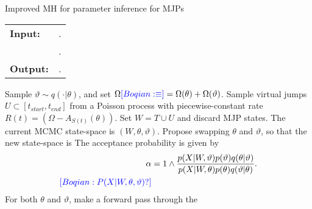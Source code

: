 \begin{algorithm}[H]
   \caption{Improved MH for parameter inference for MJPs }
   \label{alg:MH_improved}
  \begin{tabular}{l l}
   \textbf{Input:  } & \text{The observations $X$,}
                      \text{the previous MJP path $S(t) = (S, T)$ and parameters $\theta$ \boqian{and $\pi_0$}}.\\ 
                     & \text{A  Metropolis-Hasting proposal $q(\cdot | \theta)$}.\\
   \textbf{Output:  }& \text{A new MJP trajectory $S'(t) = (S', T')$, 
                            new MJP parameters $\theta'$}.\\
   \hline
   \end{tabular}
   \begin{algorithmic}[1]
      \State Sample $\vartheta \sim q(\cdot| \theta)$, and 
      set %
	$\Omega \textcolor{blue}{[Boqian: \equiv]} = \Omega(\theta) + \Omega(\vartheta)$.
    \State Sample virtual jumps $U\subset[t_{start}, t_{end}]$ from a Poisson process with 
    piecewise-constant rate $R(t) = (\Omega - A_{S(t)}(\theta))$. 
    Set $W = T \cup U$ and discard MJP states.
    \State The current MCMC state-space is $(W,\theta,\vartheta)$. Propose swapping
    $\theta$ and $\vartheta$, so that the new state-space is 
     The acceptance probability is given by
        \begin{align*}
        \alpha %
        &=  1 \wedge \frac{p(X| W,\vartheta)p(\vartheta)q(\theta|\vartheta)}
        {p(X| W,\theta)p(\theta) q(\vartheta|\theta)}.\\
        \boqian{P(X | W, \theta, \vartheta)?}
        \end{align*}
    \State For both $\theta$ and $\vartheta$, make a forward pass through the 

\end{algorithmic}
\end{algorithm}
